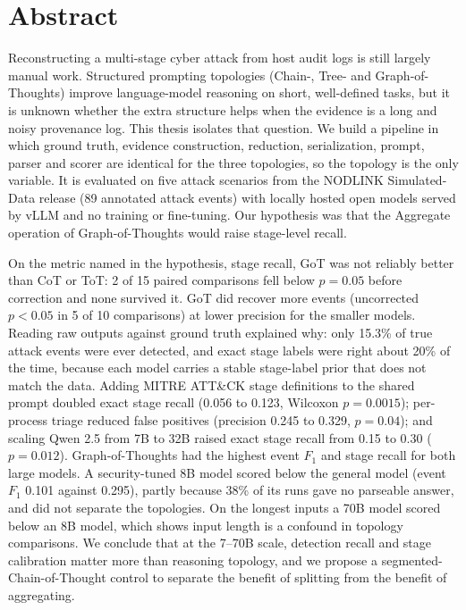 \chapter*{Abstract}

Reconstructing a multi-stage cyber attack from host audit logs is still largely manual work. Structured prompting topologies (Chain-, Tree- and Graph-of-Thoughts) improve language-model reasoning on short, well-defined tasks, but it is unknown whether the extra structure helps when the evidence is a long and noisy provenance log. This thesis isolates that question. We build a pipeline in which ground truth, evidence construction, reduction, serialization, prompt, parser and scorer are identical for the three topologies, so the topology is the only variable. It is evaluated on five attack scenarios from the NODLINK Simulated-Data release (89 annotated attack events) with locally hosted open models served by vLLM and no training or fine-tuning. Our hypothesis was that the Aggregate operation of Graph-of-Thoughts would raise stage-level recall.

On the metric named in the hypothesis, stage recall, GoT was not reliably better than CoT or ToT: 2 of 15 paired comparisons fell below $p=0.05$ before correction and none survived it. GoT did recover more events (uncorrected $p<0.05$ in 5 of 10 comparisons) at lower precision for the smaller models. Reading raw outputs against ground truth explained why: only 15.3\% of true attack events were ever detected, and exact stage labels were right about 20\% of the time, because each model carries a stable stage-label prior that does not match the data. Adding MITRE ATT\&CK stage definitions to the shared prompt doubled exact stage recall (0.056 to 0.123, Wilcoxon $p=0.0015$); per-process triage reduced false positives (precision 0.245 to 0.329, $p=0.04$); and scaling Qwen 2.5 from 7B to 32B raised exact stage recall from 0.15 to 0.30 ($p=0.012$). Graph-of-Thoughts had the highest event $F_1$ and stage recall for both large models. A security-tuned 8B model scored below the general model (event $F_1$ 0.101 against 0.295), partly because 38\% of its runs gave no parseable answer, and did not separate the topologies. On the longest inputs a 70B model scored below an 8B model, which shows input length is a confound in topology comparisons. We conclude that at the 7--70B scale, detection recall and stage calibration matter more than reasoning topology, and we propose a segmented-Chain-of-Thought control to separate the benefit of splitting from the benefit of aggregating.
